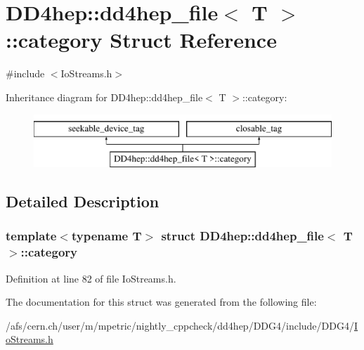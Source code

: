 \hypertarget{struct_d_d4hep_1_1dd4hep__file_1_1category}{}\section{D\+D4hep\+:\+:dd4hep\+\_\+file$<$ T $>$\+:\+:category Struct Reference}
\label{struct_d_d4hep_1_1dd4hep__file_1_1category}


{\ttfamily \#include $<$Io\+Streams.\+h$>$}

Inheritance diagram for D\+D4hep\+:\+:dd4hep\+\_\+file$<$ T $>$\+:\+:category\+:\begin{figure}[H]
\begin{center}
\leavevmode
\includegraphics[height=2.000000cm]{struct_d_d4hep_1_1dd4hep__file_1_1category}
\end{center}
\end{figure}


\subsection{Detailed Description}
\subsubsection*{template$<$typename T$>$\newline
struct D\+D4hep\+::dd4hep\+\_\+file$<$ T $>$\+::category}



Definition at line 82 of file Io\+Streams.\+h.



The documentation for this struct was generated from the following file\+:\begin{DoxyCompactItemize}
\item 
/afs/cern.\+ch/user/m/mpetric/nightly\+\_\+cppcheck/dd4hep/\+D\+D\+G4/include/\+D\+D\+G4/\hyperlink{_io_streams_8h}{Io\+Streams.\+h}\end{DoxyCompactItemize}
